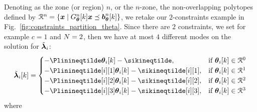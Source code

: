 \documentclass[../main.tex]{subfiles}
\begin{document}
Denoting as the zone (or region) $n$, or the $n$-zone, the non-overlapping polytopes defined by ${\mathcal{R}^{n}=\{\boldsymbol{x}\mid G_{\boldsymbol{\theta}}^{n}[k]\boldsymbol{x} \preceq \boldsymbol{b}_{\boldsymbol{\theta}}^{n}[k]\}}$, we retake our $2$-constraints example in Fig.~\ref{fig:constraints_partition_theta}.
Since there are $2$ constraints, we set for example $c=1$ and $N=2$, then we have at most $4$ different modes on the solution for $\tilde{\boldsymbol{\lambda}}_{i}$:
\begin{equation}
  \lambdaicheat[k]=
  \begin{cases}
    -\Plinineqtilde      \thetaik-\sikineqtilde      ,&\text{if }\thetaik\in\set{R}^{0}\\
    -\Plinineqtilde[i][1]\thetaik-\sikineqtilde[i][1],&\text{if }\thetaik\in\set{R}^{1}\\
    -\Plinineqtilde[i][2]\thetaik-\sikineqtilde[i][2],&\text{if }\thetaik\in\set{R}^{2}\\
    -\Plinineqtilde[i][3]\thetaik-\sikineqtilde[i][3],&\text{if }\thetaik\in\set{R}^{3}\\
  \end{cases}\label{eq:1}
\end{equation}
where
\end{document}
